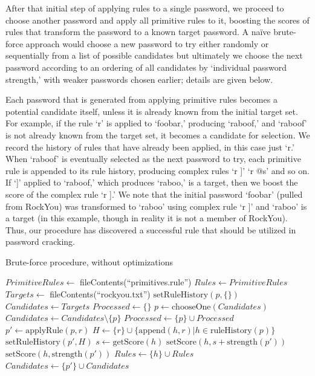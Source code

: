 \documentclass{article}
\begin{document}
After that initial step of applying rules to a single password, we proceed to
choose another password and apply all primitive rules to it, boosting the
scores of rules that transform the password to a known target password. A
naïve brute-force approach would choose a new password to try either randomly
or sequentially from a list of possible candidates but ultimately we
choose the next password according to an ordering of all candidates by
`individual password strength,' with weaker passwords chosen earlier; details
are given below.

Each password that is generated from applying primitive rules becomes a
potential candidate itself, unless it is already known from the initial target
set. For example, if the rule `r' is applied to `foobar,' producing `raboof,'
and `raboof' is not already known from the target set, it becomes a candidate
for selection. We record the history of rules that have already been applied, in
this case just `r.' When `raboof' is eventually selected as the next password to
try, each primitive rule is appended to its rule history, producing complex
rules `r ]' `r @s' and so on. If `]' applied to `raboof,' which produces
`raboo,' is a target, then we boost the score of the complex rule `r ].' We note
that the initial password `foobar' (pulled from RockYou) was transformed to
`raboo' using complex rule `r ]' and `raboo' is a target (in this example,
though in reality it is not a member of RockYou). Thus, our procedure has
discovered a successful rule that should be utilized in password cracking.

\begin{algorithm}[t!]\caption{Brute-force procedure, without optimizations}
\begin{algorithmic}[1]
\State $PrimitiveRules \gets $ fileContents(``primitives.rule'')
\State $Rules \gets PrimitiveRules$
\State $Targets \gets $ fileContents(``rockyou.txt'')
  \State $\mathrm{setRuleHistory}(p, \{\})$
\EndFor
\State $Candidates \gets Targets$
\State $Processed \gets \{\}$
  \State $p \gets \mathrm{chooseOne}(Candidates)$
  \State $Candidates \gets Candidates \setminus \{p\}$
  \State $Processed \gets \{p\} \cup Processed$
    \State $p' \gets \mathrm{applyRule}(p, r)$
    \State $H \gets \{r\}\cup\{\mathrm{append}(h, r)|h \in
\mathrm{ruleHistory}(p)\}$
    \State $\mathrm{setRuleHistory}(p', H)$
          \State $s \gets \mathrm{getScore}(h)$
          \State $\mathrm{setScore}(h,
s+\mathrm{strength}(p'))$
        \Else
          \State $\mathrm{setScore}(h, \mathrm{strength}(p'))$
          \State $Rules \gets \{h\}\cup Rules$
        \EndIf
      \EndFor
    \EndIf
      \State $Candidates \gets \{p'\}\cup Candidates$
    \EndIf
  \EndFor
\EndWhile
\end{algorithmic}
\label{alg:brute-force}
\end{algorithm}
\end{document}
